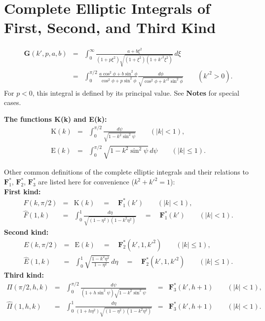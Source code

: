 \documentclass[]{article}
\begin{document}
\section{Complete Elliptic Integrals of First, Second, and Third
Kind}
\begin{eqnarray*}
\mathbf{G}(k',p,a,b) & = & \displaystyle
\int_0^\infty \frac{a+b\xi^2}{(1+p\xi^2)\sqrt{(1+\xi^2)(1+{k'}^2\xi^2)}}
\, d\xi  \\[3mm]
& = & \displaystyle \int_0^{\pi/2} \frac{a \cos^2 \phi + b \sin^2 \phi}
{\cos^2 \phi + p \sin^2 \phi} \frac{d\phi}
{\sqrt{\cos^2 \phi + {k'}^2 \sin^2 \phi}} \qquad ({k'}^2 > 0).
\end{eqnarray*}
For $p < 0$, this integral is defined by its principal value.
See {\bf Notes} for special cases.

{\bf The functions K(k) and E(k):}
\begin{eqnarray*}
\mathrm{K}(k) & = & \displaystyle \int_0^{\pi/2}
\frac{d\psi}{\sqrt{1-k^2\sin^2 \psi}} \qquad (|k| < 1), \\
\mathrm{E}(k) & = & \displaystyle \int_0^{\pi/2}
\sqrt{1-k^2\sin^2 \psi} \, d\psi \qquad (|k| \le 1).
\end{eqnarray*}

Other common definitions of the complete elliptic integrals and their
relations to $\mathbf{F}_1^*$, $\mathbf{F}_2^*$, $\mathbf{F}_3^*$ are
listed here for convenience ($k^2+{k'}^2 = 1$): \\[2mm]
{\bf First kind:}
$$ \begin{array}{rcl}
F(k,\pi/2) & = & \mathrm{K}(k) \quad = \quad \mathbf{F}_1^*(k') \qquad
(|k| < 1), \\[6mm]
\widehat{F}(1,k) & = & \displaystyle \int_0^1
\frac{d\eta}{\sqrt{(1-\eta^2)(1-k^2\eta^2)}} \quad = \quad
\mathbf{F}_1^*(k') \qquad (|k| < 1).
\end{array} $$
{\bf Second kind:}
$$ \begin{array}{rcl}
E(k,\pi/2) & = & \mathrm{E}(k) \quad = \quad \mathbf{F}_2^*(k',1,{k'}^2)
\qquad (|k| \le 1), \\[6mm]
\widehat{E}(1,k) & = & \displaystyle \int_0^1
\sqrt{\frac{1-k^2 \eta^2}{1-\eta^2}} \, d\eta \quad = \quad
\mathbf{F}_2^*(k',1,{k'}^2) \qquad (|k| \le 1).
\end{array} $$
{\bf Third kind:}
$$ \begin{array}{rclcl}
\Pi(\pi/2,h,k) & = & \displaystyle \int_0^{\pi/2}
\frac{d\psi}{(1+h\sin^2 \psi)\sqrt{1-k^2\sin^2 \psi}} & = &
\mathbf{F}_3^*(k',h+1) \qquad (|k| < 1), \\[6mm]
\widehat{\Pi}(1,h,k) & = & \displaystyle \int_0^1
\frac{d\eta}{(1+h\eta^2)\sqrt{(1-\eta^2)(1-k^2\eta^2)}} & = &
\mathbf{F}_3^*(k',h+1) \qquad (|k| < 1).
\end{array} $$
\end{document}
